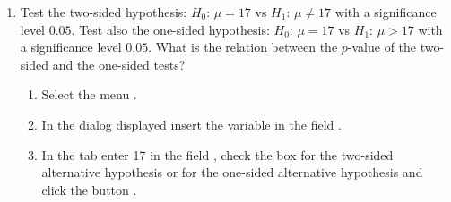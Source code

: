 \begin{enumerate}[leftmargin=*]
\begin{enumerate}
\item Test the two-sided hypothesis: $H_0$: $\mu=17$ vs $H_1$: $\mu\neq 17$ with a significance level $0.05$.
Test also the one-sided hypothesis: $H_0$: $\mu=17$ vs $H_1$: $\mu>17$ with a significance level $0.05$.
What is the relation between the $p$-value of the two-sided and the one-sided tests?
\begin{indication}
\begin{enumerate}
\item Select the menu .
\item In the dialog displayed insert the variable  in the field .
\item In the  tab enter 17 in the field , check the box 
for the two-sided alternative hypothesis or  for the one-sided alternative hypothesis and click the
button .
\end{enumerate}
\end{indication}


\end{enumerate}
\end{enumerate}
